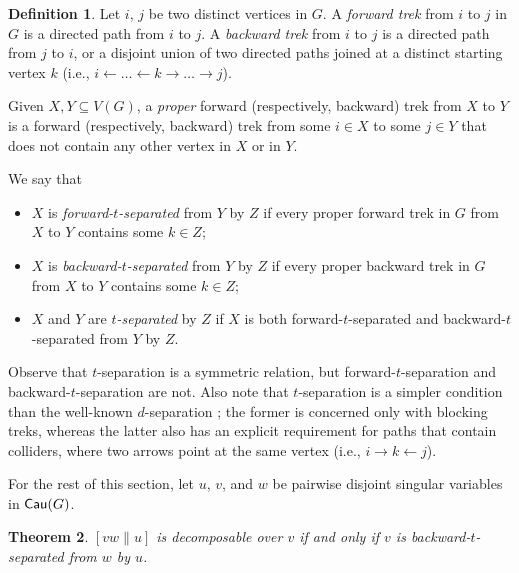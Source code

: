 \documentclass[12pt]{amsart}
\theoremstyle{plain}
\newtheorem{thm}{Theorem}[section]
\theoremstyle{definition}
\newtheorem{defn}[thm]{Definition}
\theoremstyle{remark}
\numberwithin{equation}{section}
\theoremstyle{plain}
\newcommand{\0}{\emptyset}
\newcommand{\sub}{\subseteq}
\DeclareMathOperator{\cau}{\sf{Cau}}
\newcommand{\memph}[1]{{\color{magenta}\emph{#1}}}
\begin{document}
\begin{defn}\label{def:separation}
Let  $i$, $j$ be two distinct vertices in $G$. A \memph{forward trek} from $i$ to $j$ in $G$ is a directed path from $i$ to $j$. A \memph{backward trek} from $i$ to $j$ is a directed path from $j$ to $i$, or a disjoint union of two directed paths joined at a distinct starting vertex $k$ (i.e., $i\leftarrow \dots \leftarrow k \rightarrow \dots \rightarrow j$).

Given $X, Y \sub V(G)$, a \memph{proper} forward (respectively, backward) trek from $X$ to $Y$ is a forward (respectively, backward) trek from some $i\in X$ to some $j\in Y$ that does not contain any other vertex in $X$ or in $Y$.

We say that
\begin{itemize}
  \item $X$ is \memph{forward-$t$-separated} from $Y$ by $Z$ if every proper forward trek in $G$ from $X$ to $Y$ contains some $k \in Z$;
  \item $X$ is \memph{backward-$t$-separated} from $Y$ by $Z$ if every proper backward trek in $G$ from $X$ to $Y$ contains some $k \in Z$;
  \item $X$ and $Y$ are \memph{$t$-separated} by $Z$ if $X$ is both forward-$t$-separated and backward-$t$-separated from $Y$ by $Z$.
\end{itemize}
\end{defn}

Observe that $t$-separation is a symmetric relation, but forward-$t$-separation and backward-$t$-separation are not.
Also note that $t$-separation is a simpler condition than the well-known $d$-separation \cite{Pearl1988}; the former is concerned only with blocking treks, whereas the latter also has an explicit requirement for paths that contain colliders, where two arrows point at the same vertex (i.e., $i\rightarrow k \leftarrow j$).

For the rest of this section, let $u$, $v$, and $w$ be pairwise disjoint singular variables in $\cau(G)$.

\begin{thm}\label{thm: main1}
$[vw \| u]$ is decomposable over $v$ if and only if $v$ is backward-$t$-separated from $w$ by $u$.
\end{thm}
\end{document}
